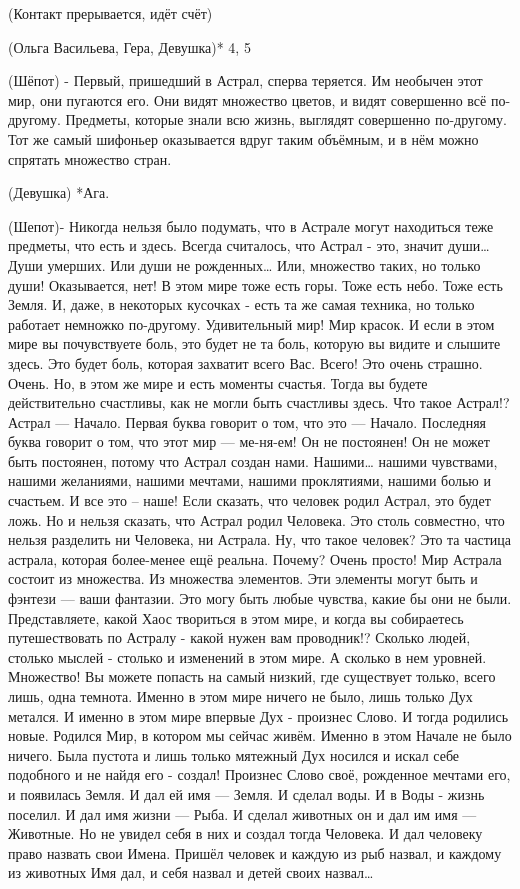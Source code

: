 (Контакт прерывается, идёт счёт)

(Ольга Васильева, Гера, Девушка)* 4, 5

(Шёпот)  - Первый, пришедший в Астрал, сперва теряется. Им необычен этот мир, они пугаются его. Они видят множество цветов, и видят совершенно всё по-другому. Предметы, которые знали всю жизнь, выглядят совершенно по-другому. Тот же самый шифоньер оказывается вдруг таким объёмным, и в нём можно спрятать множество стран. 

(Девушка)  *Ага.

(Шепот)-  Никогда нельзя было подумать, что в Астрале могут находиться теже предметы, что есть и здесь. Всегда считалось, что Астрал - это, значит души… Души умерших. Или души не рожденных… Или, множество таких, но только души! Оказывается, нет! В этом мире тоже есть горы.  Тоже есть небо. Тоже есть Земля. И, даже, в некоторых кусочках - есть та же самая техника, но только работает немножко по-другому. Удивительный мир! Мир красок. И если в этом мире вы почувствуете боль, это будет не та боль, которую вы видите и слышите здесь. Это будет боль, которая захватит всего Вас. Всего! Это очень страшно. Очень. Но, в этом же мире и есть моменты счастья. Тогда вы будете действительно счастливы, как не могли быть счастливы здесь. Что такое Астрал!? Астрал — Начало. Первая буква говорит о том, что это — Начало. Последняя буква говорит о том, что этот мир — ме-ня-ем! Он не постоянен! Он не может быть постоянен, потому что Астрал создан нами. Нашими… нашими чувствами, нашими желаниями, нашими мечтами, нашими проклятиями, нашими болью и счастьем. И все это – наше! Если сказать, что человек родил Астрал, это будет ложь. Но и нельзя сказать, что Астрал родил Человека. Это столь совместно, что нельзя разделить ни Человека, ни Астрала. Ну, что такое человек? Это та частица астрала, которая более-менее ещё реальна. Почему? Очень просто! Мир Астрала состоит из множества. Из множества элементов. Эти элементы могут быть и фэнтези — ваши фантазии. Это могу быть любые чувства, какие бы они не были. Представляете, какой Хаос твориться в этом мире, и когда вы собираетесь путешествовать по Астралу - какой нужен вам проводник!? Сколько людей, столько мыслей - столько и изменений в этом мире. А сколько в нем уровней. Множество! Вы можете попасть на самый низкий, где существует только,  всего лишь, одна темнота. Именно в этом мире ничего не было, лишь только Дух метался. И именно в этом мире впервые Дух - произнес Слово. И тогда родились новые. Родился Мир, в котором мы сейчас живём. Именно в этом Начале не было ничего. Была пустота и лишь только мятежный Дух носился и искал себе подобного и не найдя его  - создал! Произнес Слово своё, рожденное мечтами его, и появилась Земля. И дал ей имя — Земля. И сделал воды. И в Воды - жизнь поселил. И дал имя жизни — Рыба. И сделал животных он и дал им имя — Животные. Но не увидел себя в них и создал тогда Человека. И дал человеку право назвать свои Имена. Пришёл человек и каждую из рыб назвал, и каждому из животных Имя дал, и себя назвал и детей своих назвал…

